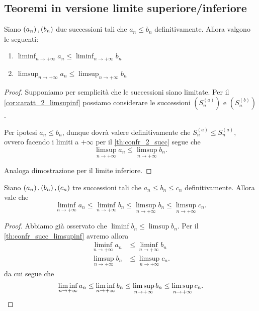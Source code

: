 \subsection{Teoremi in versione limite superiore/inferiore}

\begin{theorem}
    \label{th:confr_succ_limsupinf}
    Siano $\seqn*{a}, \seqn*{b}$ due successioni tali che $a_n \leq b_n$ definitivamente. Allora valgono le seguenti:
    \begin{enumerate}[label={(\roman*)}, ref={\thetheorem: (\roman*)}]
        \item $\displaystyle \liminf_{n \to +\infty} a_n \leq \liminf_{n \to +\infty} b_n$ 
        \item $\displaystyle \limsup_{n \to +\infty} a_n \leq \limsup_{n \to +\infty} b_n$
    \end{enumerate}
\end{theorem}
\begin{proof}
    Supponiamo per semplicità che le successioni siano limitate. Per il \autoref{cor:caratt_2_limsupinf} possiamo considerare le successioni $\left(S^{(a)}_n\right)$ e $\left(S^{(b)}_n\right)$.

    Per ipotesi $a_n \leq b_n$, dunque dovrà valere definitivamente che $S^{(a)}_n \leq S^{(a)}_n$, ovvero facendo i limiti a $+\infty$ per il \autoref{th:confr_2_succ} segue che \[
        \limsup_{n \to +\infty} a_n \leq \limsup_{n \to +\infty} b_n.
    \]

    Analoga dimostrazione per il limite inferiore.
\end{proof}

\begin{theorem}
    \label{th:carab_limsupinf}
    Siano $\seqn*{a}, \seqn*{b}, \seqn*{c}$ tre successioni tali che $a_n \leq b_n \leq c_n$ definitivamente.
    Allora vale che \[
        \liminf_{n\to +\infty} a_n \leq \liminf_{n\to +\infty} b_n \leq \limsup_{n\to +\infty} b_n \leq \limsup_{n\to +\infty} c_n.
    \]
\end{theorem}
\begin{proof}
    Abbiamo già osservato che $\liminf b_n \leq \limsup b_n$. Per il \autoref{th:confr_succ_limsupinf} avremo allora \begin{align*}
        \liminf_{n \to +\infty} a_n &\leq \liminf_{n \to +\infty} b_n \tag{siccome $a_n \leq b_n$}\\
        \limsup_{n \to +\infty} b_n &\leq \limsup_{n \to +\infty} c_n. \tag{siccome $b_n \leq c_n$}
    \end{align*}
    da cui segue che \[
        \liminf_{n \to +\infty} a_n \leq \liminf_{n \to +\infty} b_n \leq \limsup_{n \to +\infty} b_n \leq \limsup_{n \to +\infty} c_n. \qedhere
    \]
\end{proof}